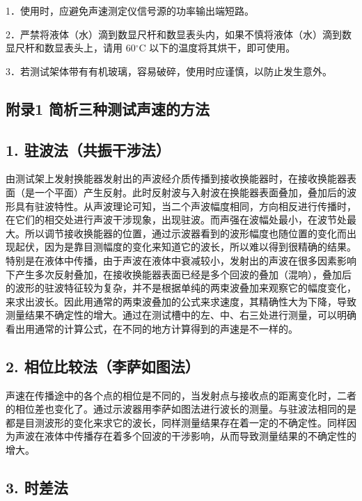 \documentclass[
  10
]{article}
\begin{document}
1．使用时，应避免声速测定仪信号源的功率输出端短路。

2．严禁将液体（水）滴到数显尺杆和数显表头内，如果不慎将液体（水）滴到数显尺杆和数显表头上，请用
\(6 0 \mathrm { { } ^ { \circ } C }\) 以下的温度将其烘干，即可使用。

3．若测试架体带有有机玻璃，容易破碎，使用时应谨慎，以防止发生意外。

\subsection{附录1
简析三种测试声速的方法}\label{ux9644ux5f551-ux7b80ux6790ux4e09ux79cdux6d4bux8bd5ux58f0ux901fux7684ux65b9ux6cd5}

\subsection{1.
驻波法（共振干涉法）}\label{ux9a7bux6ce2ux6cd5ux5171ux632fux5e72ux6d89ux6cd5}

由测试架上发射换能器发射出的声波经介质传播到接收换能器时，在接收换能器表面（是一个平面）产生反射。此时反射波与入射波在换能器表面叠加，叠加后的波形具有驻波特性。从声波理论可知，当二个声波幅度相同，方向相反进行传播时，在它们的相交处进行声波干涉现象，出现驻波。而声强在波幅处最小，在波节处最大。所以调节接收换能器的位置，通过示波器看到的波形幅度也随位置的变化而出现起伏，因为是靠目测幅度的变化来知道它的波长，所以难以得到很精确的结果。特别是在液体中传播，由于声波在液体中衰减较小，发射出的声波在很多因素影响下产生多次反射叠加，在接收换能器表面已经是多个回波的叠加（混响），叠加后的波形的驻波特征较为复杂，并不是根据单纯的两束波叠加来观察它的幅度变化，来求出波长。因此用通常的两束波叠加的公式来求速度，其精确性大为下降，导致测量结果不确定性的增大。通过在测试槽中的左、中、右三处进行测量，可以明确看出用通常的计算公式，在不同的地方计算得到的声速是不一样的。

\subsection{2.
相位比较法（李萨如图法）}\label{ux76f8ux4f4dux6bd4ux8f83ux6cd5ux674eux8428ux5982ux56feux6cd5}

声速在传播途中的各个点的相位是不同的，当发射点与接收点的距离变化时，二者的相位差也变化了。通过示波器用李萨如图法进行波长的测量。与驻波法相同的是都是目测波形的变化来求它的波长，同样测量结果存在着一定的不确定性。同样因为声波在液体中传播存在着多个回波的干涉影响，从而导致测量结果的不确定性的增大。

\subsection{3. 时差法}\label{ux65f6ux5deeux6cd5}
\end{document}
